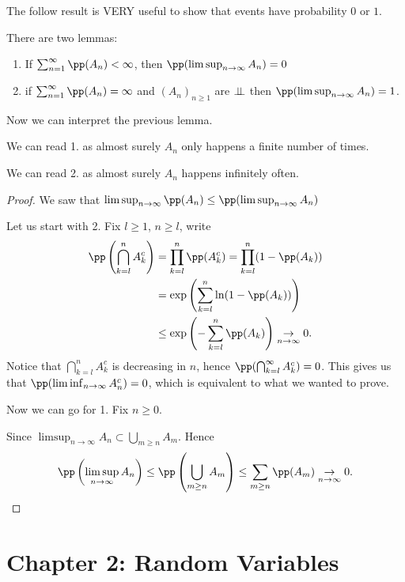 \documentclass[../main.tex]{subfiles}
\begin{document}
  The follow result is VERY useful to show that events have probability $0$ or $1$.
  \begin{lemma}
    There are two lemmas:
    \begin{enumerate}
      \item If $\sum_{n=1}^{\infty} \pp(A_n) < \infty$, then $\pp(\limsup_{n \to \infty} A_n) =
        0$
      \item if $\sum_{n = 1}^{\infty} \pp(A_n) = \infty$ and $(A_n)_{n \geq 1}$ are $\perp\!\!\!\!\,\perp$ then
      $\pp(\limsup_{n \to \infty} A_n) = 1$.
    \end{enumerate}
  \end{lemma}
  Now we can interpret the previous lemma. 

  We can read 1. as almost surely $A_n$ only
  happens a finite number of times.

  We can read 2. as almost surely $A_n$ happens infinitely often.

  \begin{proof}
    We saw that $\limsup_{n \to \infty}\pp(A_n) \leq \pp(\limsup_{n \to \infty} A_n) $

    Let us start with 2. Fix $l \geq 1$, $n \geq l$, write 
    \begin{align*}
      \pp\left(\bigcap_{k=l}^n A_k^c\right) &=
    \prod_{k=l}^n \pp(A_k^c) = \prod_{k=l}^n (1 - \pp(A_k)) \\
      &= \exp\left(\sum_{k=l}^n \ln(1 - \pp(A_k))\right) \\
      &\leq \exp \left( - \sum_{k = l}^n \pp(A_k) \right) \underset{n \to \infty}{\rightarrow}
      0.
    \end{align*}
    Notice that $\bigcap_{k=l}^n A_k^c$ is decreasing in $n$, hence $\pp(\bigcap_{k=l}^\infty
    A_k^c) = 0$. This gives us that $\pp(\liminf_{n \to \infty} A_n^c) = 0$, which is
    equivalent to what we wanted to prove.

    \vspace{0.3em}

    Now we can go for 1. Fix $n \geq 0$.

    Since $\limsup_{n \to \infty} A_n \subset \bigcup_{m \geq n} A_m$. Hence 
    \[
    \pp \left( \limsup_{n \to \infty} A_n \right) \leq \pp \left( \bigcup_{m \geq n} A_m
    \right) \leq \sum_{m \geq n} \pp(A_m) \underset{n \to \infty}{\rightarrow} 0
    .\] 
  \end{proof}

  \section{Chapter 2: Random Variables}
\end{document}
